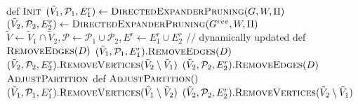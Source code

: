 \documentclass[11pt]{article}
\begin{document}
\begin{algorithm}[H]
    \begin{algorithmic}
    \caption{$\textsc{BiDirectedExpanderPruning}(G, W, \Pi)$}\label{alg:BiDirectedExpanderPruning}
    \State def $\textsc{Init}$
    \Indent
    \State $(\tilde{V}_1, \mathcal{P}_1, E^r_1) \leftarrow \textsc{DirectedExpanderPruning}(G, W, \Pi)$
    \State $(\tilde{V}_2, \mathcal{P}_2, E^r_2) \leftarrow \textsc{DirectedExpanderPruning}(G^{rev}, W, \Pi)$
    \State $\tilde{V} \leftarrow \tilde{V}_1 \cap \tilde{V}_2, \mathcal{P} \leftarrow \mathcal{P}_1 \cup \mathcal{P}_2, E^r \leftarrow E^r_1 \cup E^r_2$ // dynamically updated
    \EndIndent
    \State 
    \State def $\textsc{RemoveEdges}(D)$
    \Indent
    \State $(\tilde{V}_1, \mathcal{P}_1, E^r_1).\textsc{RemoveEdges}(D)$ 
    \State $(\tilde{V}_2, \mathcal{P}_2, E^r_2).\textsc{RemoveVertices}(\tilde{V}_2 \setminus \tilde{V}_1)$
    \State $(\tilde{V}_2, \mathcal{P}_2, E^r_2).\textsc{RemoveEdges}(D)$ 
    \State $\textsc{AdjustPartition}$
    \EndIndent
    \State
    \State def $\textsc{AdjustPartition}()$
    \Indent
    \State $(\tilde{V}_1, \mathcal{P}_1, E^r_1).\textsc{RemoveVertices}(\tilde{V}_1 \setminus \tilde{V}_2)$
    \State $(\tilde{V}_2, \mathcal{P}_2, E^r_2).\textsc{RemoveVertices}(\tilde{V}_2 \setminus \tilde{V}_1)$
    \EndWhile
    \EndIndent
    \end{algorithmic}
    \label{alg:bidirectedExp}
\end{algorithm}
\end{document}
